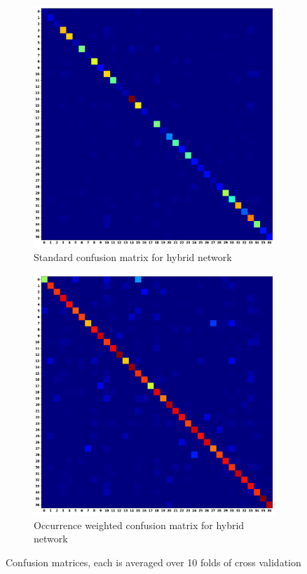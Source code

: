 \documentclass[12pt,letterpaper]{article}
\begin{document}
\begin{figure}[H]
	\begin{subfigure}[b]{0.45\textwidth}
	\centering
	\includegraphics[scale=0.18]{../FiguresMetrics/XValAlphaCLF_Avg_Standard_Confusion}
	\caption{Standard confusion matrix for hybrid network}
	\end{subfigure}
	\hfill
	\begin{subfigure}[b]{0.45\textwidth}
	\centering
	\includegraphics[scale=0.18]{../FiguresMetrics/XValAlphaCLF_Avg_Hits_Weighted_Confusion}
	\caption{Occurrence weighted confusion matrix for hybrid network}
	\end{subfigure}	
	\caption{Confusion matrices, each is averaged over 10 folds of cross validation}
	\label{fig-MultimodalConfs}
\end{figure}
\end{document}
